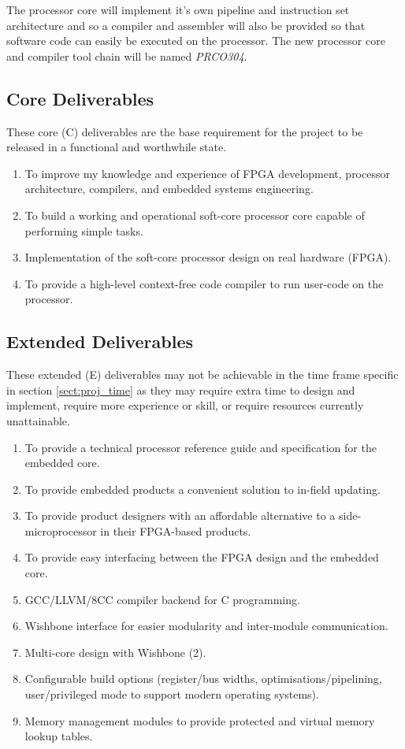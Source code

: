 \documentclass[11pt,a4paper]{report}
\newcommand{\scname}{PRCO304}
\begin{document}
The processor core will implement it's own pipeline and instruction set architecture and so a compiler and assembler will also be provided so that software code can easily be executed on the processor. The new processor core and compiler tool chain will be named \textit{\scname{}}.

\subsection{Core Deliverables}
These core (C) deliverables are the base requirement for the project to be released in a functional and worthwhile state.
\begin{enumerate}[label=\bfseries C\arabic*.]
\item{To improve my knowledge and experience of FPGA development, processor architecture, compilers, and embedded systems engineering.}
\label{c1}
\item{To build a working and operational soft-core processor core capable of performing simple tasks.}
\item{Implementation of the soft-core processor design on real hardware (FPGA).}
\item{To provide a high-level context-free code compiler to run user-code on the processor.}
\end{enumerate}

\subsection{Extended Deliverables}
These extended (E) deliverables may not be achievable in the time frame specific in section \ref{sect:proj_time} as they may require extra time to design and implement, require more experience or skill, or require resources currently unattainable.
\begin{enumerate}[label=\bfseries E\arabic*.]
\item{To provide a technical processor reference guide and specification for the embedded core.}
\item{To provide embedded products a convenient solution to in-field updating.}
\item{To provide product designers with an affordable alternative to a side-microprocessor in their FPGA-based products.}
\item{To provide easy interfacing between the FPGA design and the embedded core.}
\item{GCC/LLVM/8CC compiler backend for C programming.}\label{sect:deliv:ed:gcc}
\item{Wishbone interface for easier modularity and inter-module communication.}
\item{Multi-core design with Wishbone (2).}
\item{Configurable build options (register/bus widths, optimisations/pipelining, user/privileged mode to support modern operating systems).}
\item{Memory management modules to provide protected and virtual memory lookup tables.}
\end{enumerate}
\end{document}
